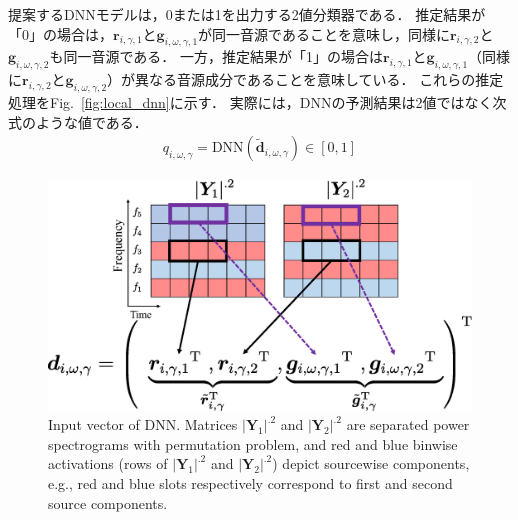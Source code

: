 提案するDNNモデルは，0または1を出力する2値分類器である．
推定結果が「0」の場合は，$\bm{r}_{i,\gamma, 1}$と$\bm{g}_{i,\omega,\gamma, 1}$が同一音源であることを意味し，同様に$\bm{r}_{i,\gamma, 2}$と$\bm{g}_{i,\omega,\gamma, 2}$も同一音源である．
一方，推定結果が「1」の場合は$\bm{r}_{i,\gamma, 1}$と$\bm{g}_{i,\omega,\gamma, 1}$（同様に$\bm{r}_{i,\gamma, 2}$と$\bm{g}_{i,\omega,\gamma, 2}$）が異なる音源成分であることを意味している．
これらの推定処理をFig.~\ref{fig:local_dnn}に示す．
実際には，DNNの予測結果は2値ではなく次式のような値である．
\begin{align}
    q_{i,\omega,\gamma} = \mathrm{DNN}\left(\tilde{\bm{d}}_{i,\omega,\gamma}\right) \in [0, 1]
\end{align}
\begin{figure}[t]
    \begin{center}
        \includegraphics[width=1.0\columnwidth]{figures/dnn_input}
    \end{center}
    \vspace{-8pt}
	\caption{Input vector of DNN. Matrices $|\bm{Y}_1|^{.2}$ and $|\bm{Y}_2|^{.2}$ are separated power spectrograms with permutation problem, and red and blue binwise activations (rows of $|\bm{Y}_1|^{.2}$ and $|\bm{Y}_2|^{.2}$) depict sourcewise components, e.g., red and blue slots respectively correspond to first and second source components.}
	\label{fig:input}
\end{figure}
